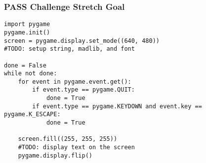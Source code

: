 \begin{frame}[fragile]
\frametitle{PASS Challenge Stretch Goal}
	
\begin{lstlisting}
import pygame
pygame.init()
screen = pygame.display.set_mode((640, 480))
#TODO: setup string, madlib, and font

done = False
while not done:
    for event in pygame.event.get():
        if event.type == pygame.QUIT:
            done = True
        if event.type == pygame.KEYDOWN and event.key == pygame.K_ESCAPE:
            done = True

    screen.fill((255, 255, 255))
    #TODO: display text on the screen
    pygame.display.flip()
\end{lstlisting}
	
\end{frame}

